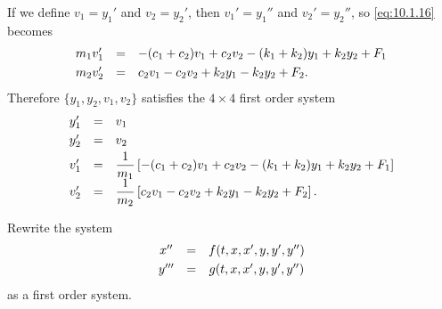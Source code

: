 \begin{examplesolution}
\solution{} If we define $v_{1}=y_{1}'$ and $v_{2}=y_{2}'$, then $v_{1}'=y_{1}''$ and
$v_{2}'=y_{2}''$, so \eqref{eq:10.1.16} becomes
\[
  \begin{array}{rcl}
    m_{1}v_{1}' & = & -(c_{1}+c_{2})v_{1}+c_{2}v_{2}-(k_{1}+k_{2})y_{1}+k_{2}y_{2}+F_{1} \\[1\jot]
    m_{2}v_{2}' & = & c_{2}v_{1}-c_{2}v_{2}+k_{2}y_{1}-k_{2}y_{2}+F_{2}.
  \end{array}
\]
Therefore $\{y_{1},y_{2},v_{1},v_{2}\}$ satisfies the $4\times4$ first order system
\begin{equation}
  \label{eq:10.1.17}
  \begin{array}{rcl}
    y_{1}' & = & v_{1}                                                                                              \\[1\jot]
    y_{2}' & = & v_{2}                                                                                              \\[1\jot]
    v_{1}' & = & \displaystyle\frac{1}{m_{1}}\left[-(c_{1}+c_{2})v_{1}+c_{2}v_{2}-(k_{1}+k_{2})y_{1}+k_{2}y_{2}+F_{1}\right] \\[1\jot]
    v_{2}' & = & \displaystyle\frac{1}{m_{2}}\left[c_{2}v_{1}-c_{2}v_{2}+k_{2}y_{1}-k_{2}y_{2}+F_{2}\right].
  \end{array}
\end{equation}

\color{blue}
\color{black}
\end{examplesolution}

\begin{example}
  \label{example:10.1.5} \rm Rewrite the system
  \[
    \begin{array}{ccc}
      x''  & = & f(t,x,x',y,y',y'') \\[1\jot]
      y''' & = & g(t,x,x',y,y',y'')
    \end{array}
  \]
  as a first order system.
\end{example}


